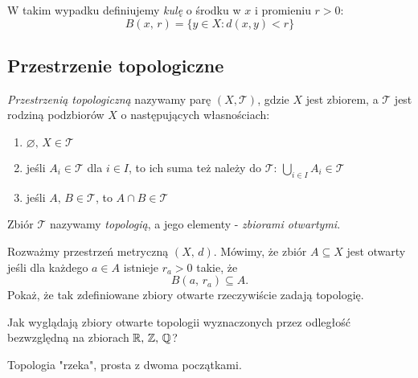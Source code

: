 W takim wypadku definiujemy \emph{kulę} o środku w $x$ i promieniu $r>0$:
$$B(x,\, r)=\{y\in X : d(x,y) < r\}$$


\subsection{Przestrzenie topologiczne}
\emph{Przestrzenią topologiczną} nazywamy parę $(X, \mathcal T)$, gdzie $X$ jest zbiorem, a $\mathcal T$ jest rodziną podzbiorów $X$ o następujących własnościach:
\begin{enumerate}
  \item $\varnothing,\, X\in \mathcal T$
  \item jeśli $A_i\in \mathcal T$ dla $i\in I$, to ich suma też należy do $\mathcal T$: $\bigcup_{i\in I}A_i\in \mathcal T$
  \item jeśli $A,\, B\in \mathcal T$, to $A\cap B\in\mathcal T$
\end{enumerate}
Zbiór $\mathcal T$ nazywamy \emph{topologią}, a jego elementy - \emph{zbiorami otwartymi}.


\begin{prob}
  Rozważmy przestrzeń metryczną $(X,\, d)$. Mówimy, że zbiór $A\subseteq X$ jest otwarty jeśli dla każdego $a\in A$ istnieje $r_a>0$ takie, że
  $$B(a,\, r_a)\subseteq A.$$
  Pokaż, że tak zdefiniowane zbiory otwarte rzeczywiście zadają topologię.
\end{prob}

\begin{prob}
  Jak wyglądają zbiory otwarte topologii wyznaczonych przez odległość bezwzględną na zbiorach $\mathbb{R},\, \mathbb{Z},\, \mathbb{Q}$?
\end{prob}

\begin{example}
  Topologia "rzeka", prosta z dwoma początkami.
\end{example}

